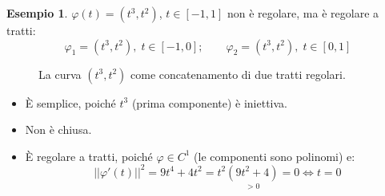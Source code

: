 \documentclass[11pt, a4paper, openright]{book}
\theoremstyle{plain}
\theoremstyle{definition}
\newtheorem{esempio}[teorema]{Esempio}
\theoremstyle{remark}
\begin{document}
\begin{esempio}
    $\varphi(t) = (t^3, t^2)$, $t \in [-1, 1]$ non è regolare, ma è regolare a tratti:
    \begin{equation}
        \varphi_1 = (t^3, t^2), \; t \in [-1, 0]; \qquad \varphi_2 = (t^3, t^2), \; t \in [0, 1]
    \end{equation}
\begin{figure}[H]
    \centering
    \caption{La curva $(t^3, t^2)$ come concatenamento di due tratti regolari.}
\end{figure}
    \begin{itemize}
        \item È semplice, poiché $t^3$ (prima componente) è iniettiva.
        \item Non è chiusa.
        \item È regolare a tratti, poiché $\varphi \in C^1$ (le componenti sono polinomi) e:
        \begin{equation}
            ||\varphi'(t)||^2 = 9t^4 + 4t^2 = t^2\underset{> 0}{(9t^2 + 4)} = 0 \iff t = 0
        \end{equation}
    \end{itemize}
\end{esempio}
\end{document}
